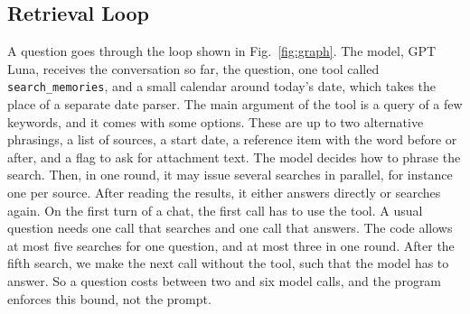 \documentclass[conference]{IEEEtran}
\newcommand{\llmname}{GPT\nobreakdash-6 Luna}
\begin{document}
\subsection{Retrieval Loop}
A question goes through the loop shown in Fig.~\ref{fig:graph}. The model, \llmname{}, receives the conversation so far, the question, one tool called \texttt{search\_memories}, and a small calendar around today's date, which takes the place of a separate date parser. The main argument of the tool is a query of a few keywords, and it comes with some options. These are up to two alternative phrasings, a list of sources, a start date, a reference item with the word before or after, and a flag to ask for attachment text. The model decides how to phrase the search. Then, in one round, it may issue several searches in parallel, for instance one per source. After reading the results, it either answers directly or searches again. On the first turn of a chat, the first call has to use the tool. A usual question needs one call that searches and one call that answers. The code allows at most five searches for one question, and at most three in one round. After the fifth search, we make the next call without the tool, such that the model has to answer. So a question costs between two and six model calls, and the program enforces this bound, not the prompt.
\end{document}
